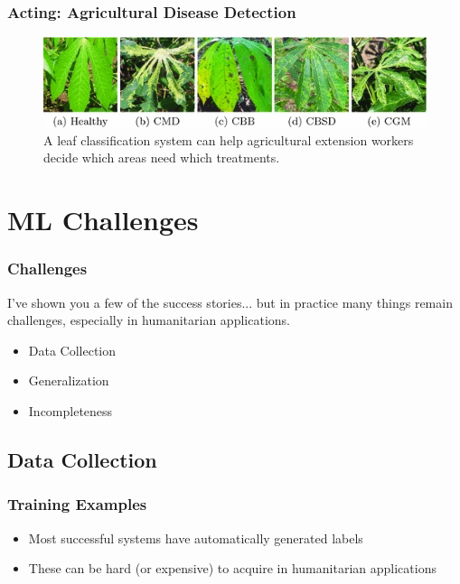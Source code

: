 \documentclass[10pt,mathserif]{beamer}
\begin{document}
\begin{frame}
  \frametitle{Acting: Agricultural Disease Detection}
  \begin{figure}[ht]
    \centering
    \includegraphics[options]{figures/cassava}
    \caption{A leaf classification system can help agricultural extension
      workers decide which areas need which treatments. \label{fig:cassava} }
  \end{figure}

\end{frame}

\section{ML Challenges}
\label{sec:label}

\begin{frame}
  \frametitle{Challenges}

  I've shown you a few of the success stories... but in practice many things
  remain challenges, especially in humanitarian applications.

  \begin{itemize}
  \item Data Collection
  \item Generalization
  \item Incompleteness
  \end{itemize} 
\end{frame}

\subsection{Data Collection}
\label{subsec:label}

\begin{frame}
  \frametitle{Training Examples}
  \begin{itemize}
  \item Most successful systems have automatically generated labels
  \item These can be hard (or expensive) to acquire in humanitarian applications
  \end{itemize} 
\end{frame}
\end{document}
